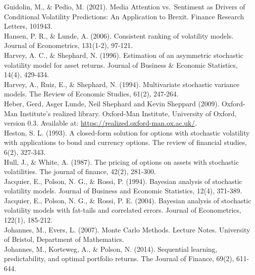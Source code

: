 \documentclass[
]{book}
\theoremstyle{break}
\theoremstyle{nonumberplain}
\begin{document}
Guidolin, M., \& Pedio, M. (2021). Media Attention vs.~Sentiment as
Drivers of Conditional Volatility Predictions: An Application to Brexit.
Finance Research Letters, 101943.\\

Hansen, P. R., \& Lunde, A. (2006). Consistent ranking of volatility
models. Journal of Econometrics, 131(1-2), 97-121.\\

Harvey, A. C., \& Shephard, N. (1996). Estimation of an asymmetric
stochastic volatility model for asset returns. Journal of Business \&
Economic Statistics, 14(4), 429-434.\\

Harvey, A., Ruiz, E., \& Shephard, N. (1994). Multivariate stochastic
variance models. The Review of Economic Studies, 61(2), 247-264.\\

Heber, Gerd, Asger Lunde, Neil Shephard and Kevin Sheppard (2009).
Oxford-Man Institute's realized library. Oxford-Man Institute,
University of Oxford, version 0.3. Available at:
\url{https://realized.oxford-man.ox.ac.uk/}.\\

Heston, S. L. (1993). A closed-form solution for options with stochastic
volatility with applications to bond and currency options. The review of
financial studies, 6(2), 327-343.\\

Hull, J., \& White, A. (1987). The pricing of options on assets with
stochastic volatilities. The journal of finance, 42(2), 281-300.\\

Jacquier, E., Polson, N. G., \& Rossi, P. (1994). Bayesian analysis of
stochastic volatility models. Journal of Business and Economic
Statistics, 12(4), 371-389.\\

Jacquier, E., Polson, N. G., \& Rossi, P. E. (2004). Bayesian analysis
of stochastic volatility models with fat-tails and correlated errors.
Journal of Econometrics, 122(1), 185-212.\\

Johannes, M., Evers, L. (2007). Monte Carlo Methods. Lecture Notes.
University of Bristol, Department of Mathematics.\\

Johannes, M., Korteweg, A., \& Polson, N. (2014). Sequential learning,
predictability, and optimal portfolio returns. The Journal of Finance,
69(2), 611-644.\\
\end{document}
